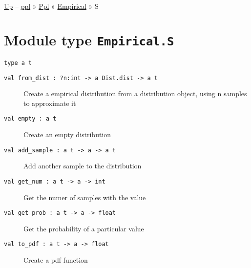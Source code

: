 \href{../index.html}{Up} -- \href{../../../index.html}{ppl} »
\href{../../index.html}{Ppl} » \href{../index.html}{Empirical} » S

\section{\texorpdfstring{Module type
\texttt{Empirical.S}}{Module type Empirical.S}}\label{module-type-empirical.s}

\protect\hyperlink{type-t}{}\texttt{type\ \textquotesingle{}a\ t}

\begin{description}
\item[{\protect\hyperlink{val-fromux5fdist}{}\texttt{val\ from\_dist\ :\ ?⁠n:int\ -\textgreater{}\ \textquotesingle{}a\ Dist.dist\ -\textgreater{}\ \textquotesingle{}a\ t}}]
Create a empirical distribution from a distribution object, using n
samples to approximate it
\end{description}

\begin{description}
\item[{\protect\hyperlink{val-empty}{}\texttt{val\ empty\ :\ \textquotesingle{}a\ t}}]
Create an empty distribution
\end{description}

\begin{description}
\item[{\protect\hyperlink{val-addux5fsample}{}\texttt{val\ add\_sample\ :\ \textquotesingle{}a\ t\ -\textgreater{}\ \textquotesingle{}a\ -\textgreater{}\ \textquotesingle{}a\ t}}]
Add another sample to the distribution
\end{description}

\begin{description}
\item[{\protect\hyperlink{val-getux5fnum}{}\texttt{val\ get\_num\ :\ \textquotesingle{}a\ t\ -\textgreater{}\ \textquotesingle{}a\ -\textgreater{}\ int}}]
Get the numer of samples with the value
\end{description}

\begin{description}
\item[{\protect\hyperlink{val-getux5fprob}{}\texttt{val\ get\_prob\ :\ \textquotesingle{}a\ t\ -\textgreater{}\ \textquotesingle{}a\ -\textgreater{}\ float}}]
Get the probability of a particular value
\end{description}

\begin{description}
\item[{\protect\hyperlink{val-toux5fpdf}{}\texttt{val\ to\_pdf\ :\ \textquotesingle{}a\ t\ -\textgreater{}\ \textquotesingle{}a\ -\textgreater{}\ float}}]
Create a pdf function
\end{description}

